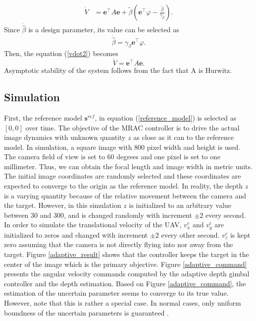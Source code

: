 \begin{align}
\dot{V}&=\mathbf{e}^\top A\mathbf{e}+\tilde{\beta}(\mathbf{e}^\top\varphi-\frac{\dot{\hat{\beta}}}{\gamma_\beta}).
\end{align}
Since $\dot{\hat{\beta}}$ is a design parameter, its value can be selected as 
\begin{equation}
\dot{\hat{\beta}}=\gamma_\beta\mathbf{e}^\top\varphi.
\end{equation}
Then, the equation (\ref{vdot2}) becomes
\begin{equation}
\dot{V}=\mathbf{e}^\top A\mathbf{e}.
\end{equation}
Asymptotic stability of the system follows from the fact that A is Hurwitz.
\subsection{Simulation}
First, the reference model $\mathbf{s}^{ref}$, in equation (\ref{reference_model}) is selected as $[0, 0]$ over time. The objective of the MRAC controller is to drive the actual image dynamics with unknown quantity $z$ as close as it can to the reference model. In simulation, a square image with 800 pixel width and height is used. The camera field of view is set to 60 degrees and one pixel is set to one millimeter. Thus, we can obtain the focal length and image width in metric units. The initial image coordinates are randomly selected and these coordinates are expected to converge to the origin as the reference model. In reality, the depth $z$ is a varying quantity because of the relative movement between the camera and the target. However, in this simulation $z$ is initialized to an arbitrary value between 30 and 300, and is changed randomly with increment $\pm2$ every second. In order to simulate the translational velocity of the UAV, $v_x^c$ and $v_y^c$ are initialized to zeros and changed with increment $\pm2$ every other second. $v_z^c$ is kept zero assuming that the camera is not directly flying into nor away from the target. Figure \ref{adaptive_result} shows that the controller keeps the target in the center of the image which is the primary objective. Figure \ref{adaptive_command} presents the angular velocity commands computed by the adaptive depth gimbal controller and the depth estimation. Based on Figure \ref{adaptive_command}, the estimation of the uncertain parameter seems to converge to its true value. However, note that this is rather a special case. In normal cases, only uniform boundness of the uncertain parameters is guaranteed \cite{Lavretsky2013}. 
